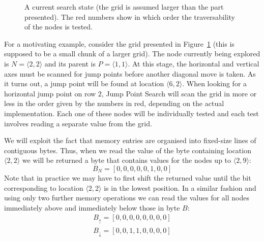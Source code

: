 \begin{figure}[tb]
  \caption{\small A current search state 
    (the grid is assumed larger than the part presented).
  The red numbers show in which order the traversability of the nodes 
  is tested.}
  \label{fig::gridforblocks}
\end{figure}

For a motivating example, consider the grid presented in 
Figure~\ref{fig::gridforblocks} 
(this is supposed to be a small chunk of a larger grid).  
The node currently being explored is $N = \langle 2,2\rangle$ 
and its parent is $P = \langle 1,1\rangle$.  
At this stage, the horizontal and vertical axes must be scanned 
for jump points before another diagonal move is taken.  
As it turns out, a jump point will be found at location $\langle 6,2\rangle$.  
When looking for a horizontal jump point on row $2$, Jump Point Search will 
scan the grid in more or less in the order given by the numbers in red, 
depending on the actual implementation.  
Each one of these nodes will be individually tested and each test
involves reading a separate value from the grid.

We will exploit the fact that memory entries are organised into fixed-size 
lines of contiguous bytes. Thus, when we read the value of the
byte containing location $\langle 2, 2\rangle$ we will be returned a byte
that contains values for the nodes up to $\langle 2, 9\rangle$:
\begin{equation}
B_{N} = [0,0,0,0,0,1,0,0]
\end{equation}
Note that in practice we may have to first shift the returned value until 
the bit corresponding to location $\langle 2, 2\rangle$ is in the lowest
position. In a similar fashion and using only two further memory operations we 
can read the values for all nodes immediately above and immediately
below those in byte $B$:
\begin{gather}
B_{\uparrow} = [0, 0, 0, 0, 0, 0, 0, 0]\\
B_{\downarrow} = [0, 0, 1, 1, 0, 0, 0, 0]
\end{gather}

